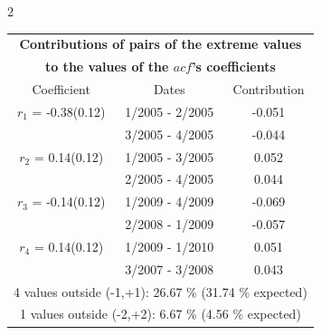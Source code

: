 
\thispagestyle{empty}
\begin{multicols}{2}{ 
\begin{tabular}{ccc}
\multicolumn{3}{c}{\textbf{Contributions of pairs of the extreme values} }  \vspace{-.10in}  \\ 
\multicolumn{3}{c}{ \textbf{to the values of the $acf$'s coefficients}} \\ 
\hline 
\hline                  Coefficient  &  Dates &  Contribution \\ 
\hline 
  $r_{ 1}$ = -0.38(0.12) &       1/2005 -  2/2005 &       -0.051    \vspace{-.10in} \\ 
  &        3/2005 -  4/2005 &       -0.044  \vspace{-.02in}   \\ \hline 
    $r_{ 2}$ = 0.14(0.12) &       1/2005 -  3/2005 &        0.052   \vspace{-.10in} \\  
&        2/2005 -  4/2005 &        0.044  \vspace{-.02in} \\ \hline 
  $r_{ 3}$ = -0.14(0.12) &       1/2009 -  4/2009 &       -0.069    \vspace{-.10in} \\ 
  &        2/2008 -  1/2009 &       -0.057  \vspace{-.02in}   \\ \hline 
    $r_{ 4}$ = 0.14(0.12) &       1/2009 -  1/2010 &        0.051   \vspace{-.10in} \\  
&        3/2007 -  3/2008 &        0.043  \vspace{-.02in} \\ \hline 
\multicolumn{3}{c}{               4 values outside (-1,+1): 26.67  \% (31.74  \% expected)}\vspace{-.10in} \\ 
\multicolumn{3}{c}{               1 values outside (-2,+2):  6.67 \%  (4.56 \% expected) } \\
 \end{tabular} \\ 
 } 
\end{multicols} 
